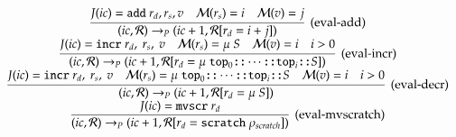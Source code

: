 \begin{equation*}
    \begin{array}{c}
    \infer[(\text{eval-add})]
        {(ic, \mathcal R) \rightarrow_P (ic + 1, \mathcal R[r_d = i + j])}
        {J(ic) = \add\ r_d, r_s, v & \mathcal M(r_s) = i & \mathcal M(v) = j}
    \\
    \infer[(\text{eval-incr})]
        {(ic, \mathcal R) 
        \rightarrow_P
        (ic + 1,\mathcal R[r_d = \mu\ \ttop_0 \cons \cdots \cons \ttop_i \cons S])}
        {J(ic) = \incr\ r_d,\ r_s,\ v &
            \mathcal M(r_s) = \mu\ S &
            \mathcal M(v) = i &
            i > 0
        }
    \\
    \infer[(\text{eval-decr})]
        {(ic, \mathcal R) 
        \rightarrow_P
        (ic + 1,\mathcal R[r_d = \mu\ S])}
        {J(ic) = \incr\ r_d,\ r_s,\ v &
            \mathcal M(r_s) = \mu\ \ttop_0 \cons \cdots \cons \ttop_i \cons S &
            \mathcal M(v) = i &
            i > 0
        }
    \\
    \infer[(\text{eval-mvscratch})]
        {
            (ic, \mathcal R) 
            \rightarrow_P
            (ic + 1,\mathcal R[r_d = \scratch\ \rho_{scratch}])
        }
        {
            J(ic) = \mvscratch\ r_d
        }
    \end{array}
\end{equation*}
